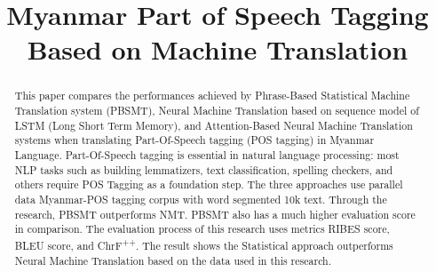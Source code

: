 \documentclass[conference]{IEEEtran}
\begin{document}
\title{Myanmar Part of Speech Tagging Based on Machine Translation}

\author{
\and
{}
\and
{}
\and
}
\maketitle

\begin{abstract}
This paper compares the performances achieved by Phrase-Based Statistical Machine Translation system (PBSMT), Neural Machine Translation based on sequence model of LSTM (Long Short Term Memory), and Attention-Based Neural Machine Translation systems when translating Part-Of-Speech tagging (POS tagging) in Myanmar Language.  Part-Of-Speech tagging is essential in natural language processing: most NLP tasks such as building lemmatizers, text classification, spelling checkers, and others require POS Tagging as a foundation step. The three approaches use parallel data Myanmar-POS tagging corpus with word segmented 10k text. Through the research, PBSMT outperforms NMT. PBSMT also has a much higher evaluation score in comparison. The evaluation process of this research uses metrics RIBES score, BLEU score, and ChrF\textsuperscript{++}. The result shows the Statistical approach outperforms Neural Machine Translation based on the data used in this research.
\end{abstract}
\end{document}

